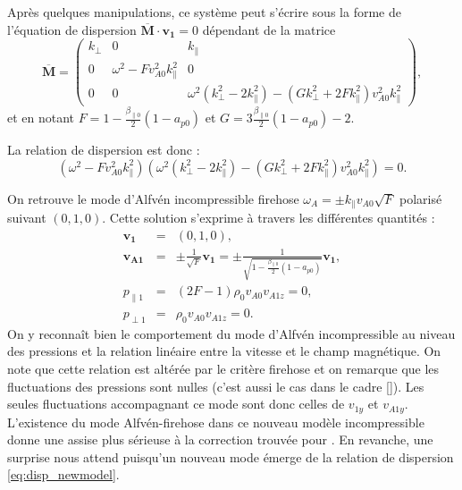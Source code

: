 Après quelques manipulations, ce système peut s'écrire sous la forme de l'équation de dispersion $\overline{\boldsymbol{M}} \cdot \boldsymbol{v_1} = 0 $ dépendant de la matrice 
\begin{equation}
 \overline{\boldsymbol{M}} =   \begin{pmatrix}
\label{eq:lin_inccpg_eqdis}  k_{\perp}  & 0 &   k_{\parallel}\\
    0 & \omega^2 - F v^2_{A0}k^2_{\parallel}  & 0 \\
    0 & 0 &  \omega^2( k^2_{\perp}  - 2 k^2_{\parallel}) - (G k^2_{\perp} + 2F k^2_{\parallel}) v^2_{A0} k^2_{\parallel}
    \end{pmatrix} ,
\end{equation}
et en notant $ F  =  1 - \frac{\beta_{\parallel 0}}{2} (1-a_{p0})$ et $G = 3\frac{\beta_{\parallel 0}}{2} (1-a_{p0}) -2$.

La relation de dispersion est donc : 
\begin{equation}
  \label{eq:disp_newmodel}  (\omega^2 - F v^2_{A0}k^2_{\parallel}) (\omega^2( k^2_{\perp}  - 2 k^2_{\parallel}) - (G k^2_{\perp} + 2F k^2_{\parallel}) v^2_{A0} k^2_{\parallel}) = 0 .
\end{equation}

On retrouve le mode d'Alfvén incompressible firehose $\omega_A = \pm k_{\parallel} v_{A0} \sqrt{F} $ polarisé suivant $(0,1,0)$. Cette solution s'exprime à travers les différentes quantités : 
\begin{eqnarray}
    \boldsymbol{v_{1}} &=& (0,1,0),\\
  \boldsymbol{v_{A1}} &=&  \pm  \frac{1}{\sqrt{F}} \boldsymbol{v_1} = \pm  \frac{1}{\sqrt{1 - \frac{\beta_{\parallel 0}}{2} (1-a_{p0})}} \boldsymbol{v_1} , \\
   p_{\parallel 1} &=&  (2F-1) \rho_0  v_{A0} v_{A1z} = 0,\\
   p_{\perp 1} &=& \rho_0 v_{A0} v_{A1z} = 0 .
\end{eqnarray}
 On y reconnaît bien le comportement du mode d'Alfvén incompressible au niveau des pressions et la relation linéaire entre la vitesse et le champ magnétique. On note que cette relation est altérée par le critère firehose et on remarque que les fluctuations des pressions sont nulles (c'est aussi le cas dans le cadre  [\cite{hunana_introductory_2019}]). Les seules fluctuations accompagnant ce mode sont donc celles de $v_{1y}$ et $v_{A1y}$. L'existence du mode Alfvén-firehose dans ce nouveau modèle incompressible donne une assise plus sérieuse à la correction trouvée pour . En revanche, une surprise nous attend puisqu'un nouveau mode émerge de la relation de dispersion \eqref{eq:disp_newmodel}. 

